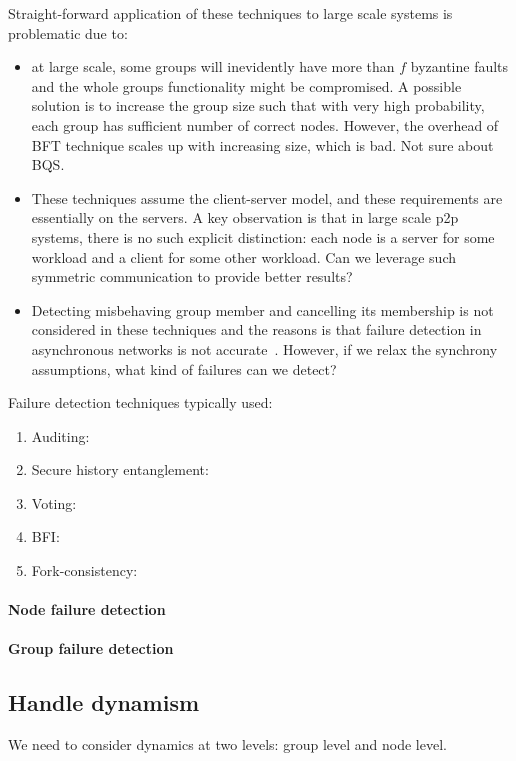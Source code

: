 Straight-forward application of these techniques to large scale systems is problematic due to:
\begin{itemize}
\item{} at large scale, some groups will inevidently have more than $f$ byzantine faults and the whole groups functionality might be compromised. A possible solution is to increase the group size such that with very high probability, each group has sufficient number of correct nodes. However, the overhead of BFT technique scales up with increasing size, which is bad. Not sure about BQS.
\item{} These techniques assume the client-server model, and these requirements are essentially on the servers. A key observation is that in large scale p2p systems, there is no such explicit distinction: each node is a server for some workload and a client for some other workload. Can we leverage such symmetric communication to provide better results?
\item{} Detecting misbehaving group member and cancelling its membership is not considered in these techniques and the reasons is that failure detection in asynchronous networks is not accurate~\cite{}. However, if we relax the synchrony assumptions, what kind of failures can we detect? 
\end{itemize}


Failure detection techniques typically used:
\begin{enumerate}
\item{Auditing:}
\item{Secure history entanglement:}
\item{Voting:}
\item{BFI:}
\item{Fork-consistency:}
\end{enumerate}

\paragraph{Node failure detection} 


\paragraph{Group failure detection}


\subsection{Handle dynamism}
We need to consider dynamics at two levels: group level and node level. 

